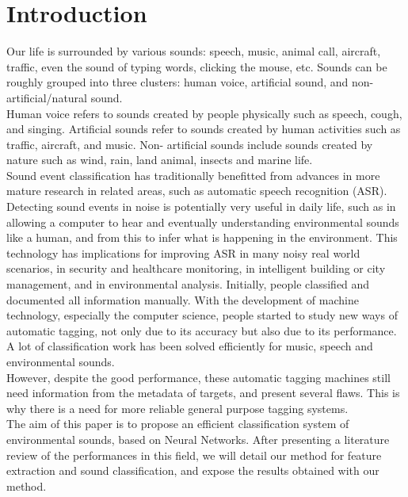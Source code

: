 \documentclass{article} %
\begin{document}
\section{Introduction}
    Our life is surrounded by various sounds: speech, music, animal call, aircraft, traffic, even the sound of typing words, clicking the mouse, etc. Sounds can be roughly grouped into three clusters: human voice, artificial sound, and non-artificial/natural sound.\\
    \newline
    Human voice refers to sounds created by people physically such as speech, cough, and singing. Artificial sounds refer to sounds created by human activities such as traffic, aircraft, and music. Non- artificial sounds include sounds created by nature such as wind, rain, land animal, insects and marine life.\\
    \newline
    Sound event classification has traditionally benefitted from advances in more mature research in related areas, such as automatic speech recognition (ASR). Detecting sound events in noise is potentially very useful in daily life, such as in allowing a computer to hear and eventually understanding environmental sounds like a human, and from this to infer what is happening in the environment. This technology has implications for improving ASR in many noisy real world scenarios, in security and healthcare monitoring, in intelligent building or city management, and in environmental analysis.
    \newline
    Initially, people classified and documented all information manually. With the development of machine technology, especially the computer science, people started to study new ways of automatic tagging, not only due to its accuracy but also due to its performance. A lot of classification work has been solved efficiently for music, speech and environmental sounds.\\
    \newline
    However, despite the good performance, these automatic tagging machines still need information from the metadata of targets, and present several flaws. This is why there is a need for more reliable general purpose tagging systems.\\

    The aim of this paper is to propose an efficient classification system of environmental sounds, based on Neural Networks. After presenting a literature review of the performances in this field, we will detail our method for feature extraction and sound classification, and expose the results obtained with our method.
    
\end{document}
